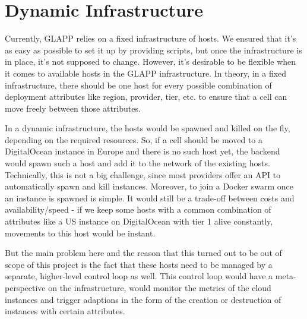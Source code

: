 \documentclass{seal_thesis}
\begin{document}
\section{Dynamic Infrastructure}
Currently, GLAPP relies on a fixed infrastructure of hosts.
We ensured that it's as easy as possible to set it up by providing scripts, but once the infrastructure is in place, it's not supposed to change.
However, it's desirable to be flexible when it comes to available hosts in the GLAPP infrastructure.
In theory, in a fixed infrastructure, there should be one host for every possible combination of deployment attributes like region, provider, tier, etc. to ensure that a cell can move freely between those attributes.

In a dynamic infrastructure, the hosts would be spawned and killed on the fly, depending on the required resources.
So, if a cell should be moved to a DigitalOcean instance in Europe and there is no such host yet, the backend would spawn such a host and add it to the network of the existing hosts.
Technically, this is not a big challenge, since most providers offer an API to automatically spawn and kill instances.
Moreover, to join a Docker swarm once an instance is spawned is simple.
It would still be a trade-off between costs and availability/speed - if we keep some hosts with a common combination of attributes like a US instance on DigitalOcean with tier 1 alive constantly, movements to this host would be instant.

But the main problem here and the reason that this turned out to be out of scope of this project is the fact that these hosts need to be managed by a separate, higher-level control loop as well.
This control loop would have a meta-perspective on the infrastructure, would monitor the metrics of the cloud instances and trigger adaptions in the form of the creation or destruction of instances with certain attributes.

\end{document}
